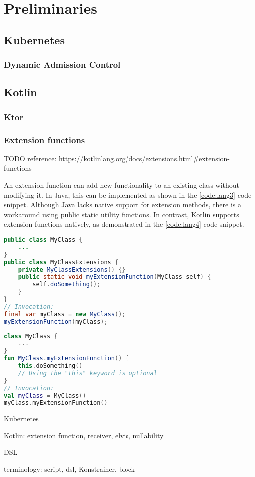 \setlength{\parindent}{0pt}
\setlength{\parskip}{0.6em}

\chapter{Preliminaries}
\label{chap:prerequisites}

\section{Kubernetes}

\subsection{Dynamic Admission Control}

\section{Kotlin}

\subsection{Ktor}

\subsection{Extension functions}
\label{sec:extension}

TODO reference: https://kotlinlang.org/docs/extensions.html\#extension-functions

An extension function can add new functionality to an existing class without modifying it. In Java, this can be implemented as shown in the \ref{code:lang3} code snippet. Although Java lacks native support for extension methods, there is a workaround using public static utility functions. In contrast, Kotlin supports extension functions natively, as demonstrated in the \ref{code:lang4} code snippet.

\begin{lstlisting}[caption={Extension functions in Java},language=Java,label=code:lang3]
public class MyClass {
    ...
}
public class MyClassExtensions {
    private MyClassExtensions() {}
    public static void myExtensionFunction(MyClass self) {
        self.doSomething();
    }
}
// Invocation:
final var myClass = new MyClass();
myExtensionFunction(myClass);
\end{lstlisting}

\begin{lstlisting}[caption={Extension functions in Kotlin},language=Kotlin,label=code:lang4]
class MyClass {
    ...
}
fun MyClass.myExtensionFunction() {
    this.doSomething()
    // Using the "this" keyword is optional
}
// Invocation:
val myClass = MyClass()
myClass.myExtensionFunction()
\end{lstlisting}

Kubernetes

Kotlin: extension function, receiver, elvis, nullability

DSL

terminology: script, dsl, Konstrainer, block
